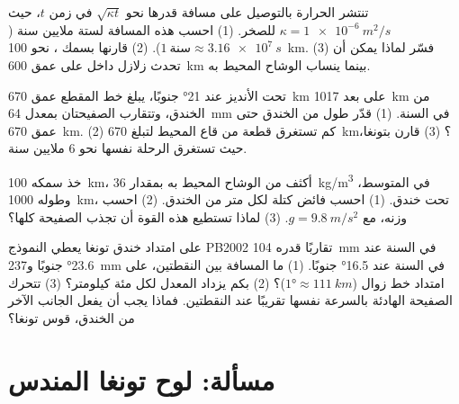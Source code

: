 \begin{exercise}[$\star\star\star$]\label{exo:g11:subduction-zones:12}
تنتشر الحرارة بالتوصيل على مسافة قدرها نحو $\sqrt{\kappa t}$ في
زمن $t$، حيث $\kappa = \qty{1e-6}{m^2/s}$ للصخر. (1) احسب هذه المسافة
لستة ملايين سنة ($1~\text{سنة} \approx \qty{3.16e7}{s}$). (2) قارنها
بسمك ، نحو \qty{100}{km}. (3) فسّر لماذا
يمكن أن تحدث زلازل داخل  على عمق \qty{600}{km} بينما ينساب الوشاح المحيط
به.
\end{exercise}

\begin{exercise}[$\star\star\star$]\label{exo:g11:subduction-zones:13}
تحت الأنديز عند \ang{21} جنوبًا، يبلغ خط المقطع عمق
\qty{670}{km} على بعد \qty{1017}{km} من الخندق، وتتقارب الصفيحتان بمعدل
\qty{64}{mm} في السنة. (1) قدّر طول  من الخندق حتى عمق
\qty{670}{km}. (2) كم تستغرق قطعة من قاع المحيط لتبلغ
\qty{670}{km}؟ (3) قارن بتونغا، حيث تستغرق الرحلة نفسها نحو 6
ملايين سنة.
\end{exercise}

\begin{exercise}[$\star\star\star$]\label{exo:g11:subduction-zones:14}
خذ  سمكه \qty{100}{km}، أكثف من الوشاح المحيط به بمقدار
\qty{36}{kg/m^3} في المتوسط، وطوله \qty{1000}{km}، تحت خندق.
(1) احسب فائض كتلة  لكل متر من الخندق. (2) احسب
وزنه، مع $g = \qty{9.8}{m/s^2}$. (3) لماذا تستطيع هذه القوة أن تجذب الصفيحة
كلها؟
\end{exercise}

\begin{exercise}[$\star\star\star$]\label{exo:g11:subduction-zones:15}
على امتداد خندق تونغا يعطي النموذج PB2002 تقاربًا قدره
\qty{104}{mm} في السنة عند \ang{23.6} جنوبًا و\qty{237}{mm} في السنة عند
\ang{16.5} جنوبًا. (1) ما المسافة بين النقطتين، على امتداد خط زوال
($\ang{1} \approx \qty{111}{km}$)؟ (2) بكم يزداد المعدل لكل
مئة كيلومتر؟ (3) تتحرك الصفيحة الهادئة بالسرعة نفسها تقريبًا عند
النقطتين. فماذا يجب أن يفعل الجانب الآخر من الخندق، قوس تونغا؟
\end{exercise}

\section{مسألة: لوح تونغا المندس}

